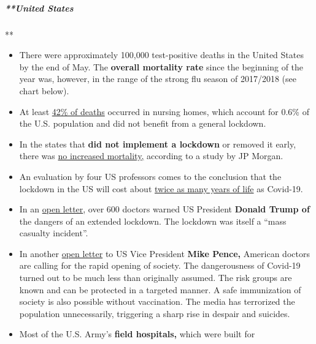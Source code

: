\hypertarget{united-states}{%
\subparagraph{**United States}\label{united-states}}

**

\begin{itemize}
\tightlist
\item
  There were approximately 100,000 test-positive deaths in the United
  States by the end of May. The \textbf{overall mortality rate} since
  the beginning of the year was, however, in the range of the strong flu
  season of 2017/2018 (see chart below).
\item
  At least
  \href{https://www.forbes.com/sites/theapothecary/2020/05/26/nursing-homes-assisted-living-facilities-0-6-of-the-u-s-population-43-of-u-s-covid-19-deaths/}{42\%
  of deaths} occurred in nursing homes, which account for 0.6\% of the
  U.S. population and did not benefit from a general lockdown.
\item
  In the states that \textbf{did not implement a lockdown} or removed it
  early, there was
  \href{https://www.dailymail.co.uk/news/article-8347635/Lockdowns-failed-alter-course-pandemic-JP-Morgan-study-claims.html}{no
  increased mortality,} according to a study by JP Morgan.
\item
  An evaluation by four US professors comes to the conclusion that the
  lockdown in the US will cost about
  \href{https://thehill.com/opinion/healthcare/499394-the-covid-19-shutdown-will-cost-americans-millions-of-years-of-life}{twice
  as many years of life} as Covid-19.
\item
  In an
  \href{https://www.washingtonexaminer.com/news/mass-casualty-incident-over-600-doctors-sign-letter-warning-trump-of-dangers-of-continued-lockdowns}{open
  letter}, over 600 doctors warned US President \textbf{Donald Trump of}
  the dangers of an extended lockdown. The lockdown was itself a ``mass
  casualty incident''.
\item
  In another
  \href{https://aapsonline.org/physician-letter-reopen-america/}{open
  letter} to US Vice President \textbf{Mike Pence,} American doctors are
  calling for the rapid opening of society. The dangerousness of
  Covid-19 turned out to be much less than originally assumed. The risk
  groups are known and can be protected in a targeted manner. A safe
  immunization of society is also possible without vaccination. The
  media has terrorized the population unnecessarily, triggering a sharp
  rise in despair and suicides.
\item
  Most of the U.S. Army's \textbf{field hospitals,} which were built for

\end{itemize}
